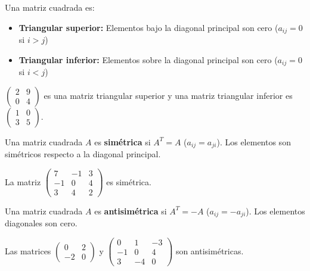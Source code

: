 \begin{definition}
Una matriz cuadrada es:
\begin{itemize}
\item \textbf{Triangular superior:} Elementos bajo la diagonal principal son cero ($a_{ij}=0$ si $i>j$)
\item \textbf{Triangular inferior:} Elementos sobre la diagonal principal son cero ($a_{ij}=0$ si $i<j$)
\end{itemize}
\end{definition}

\begin{example} $\begin{pmatrix} 2 & 9 \\ 0 & 4 \end{pmatrix}$ es una matriz triangular superior y una matriz triangular inferior es $\begin{pmatrix} 1 & 0 \\ 3 & 5 \end{pmatrix}.$
\end{example}

\begin{definition} Una matriz cuadrada $A$ es \textbf{simétrica} si $A^T = A$ ($a_{ij} = a_{ji}$). Los elementos son simétricos respecto a la diagonal principal.
\end{definition}

\begin{example} La matriz
$\begin{pmatrix}
7 & -1 & 3 \\
-1 & 0 & 4 \\
3 & 4 & 2 
\end{pmatrix}$ es simétrica.
\end{example}

\begin{definition} Una matriz cuadrada $A$ es \textbf{antisimétrica} si $A^T = -A$ ($a_{ij} = -a_{ji}$). Los elementos diagonales son cero.
\end{definition}

\begin{example} Las matrices
$\begin{pmatrix}
0 & 2 \\
-2 & 0 
\end{pmatrix}$ y $\begin{pmatrix}
0 & 1 & -3 \\
-1 & 0 & 4 \\
3 & -4 & 0 
\end{pmatrix}$ son antisimétricas.
\end{example}

